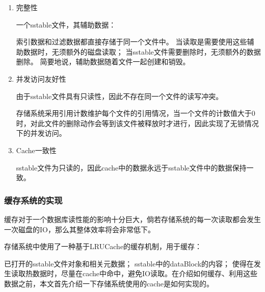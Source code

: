 \begin{enumerate}
\begin{enumerate}
\item 完整性

一个sstable文件，其辅助数据：

索引数据和过滤数据都直接存储于同一个文件中。
当读取是需要使用这些辅助数据时，无须额外的磁盘读取；
当sstable文件需要删除时，无须额外的数据删除。
简要地说，辅助数据随着文件一起创建和销毁。

\item 并发访问友好性

由于sstable文件具有只读性，因此不存在同一个文件的读写冲突。

存储系统采用引用计数维护每个文件的引用情况，当一个文件的计数值大于0时，对此文件的删除动作会等到该文件被释放时才进行，因此实现了无锁情况下的并发访问。

\item Cache一致性

sstable文件为只读的，因此cache中的数据永远于sstable文件中的数据保持一致。
				\end{enumerate}
			\end{enumerate}


		\subsubsection{缓存系统的实现}

		缓存对于一个数据库读性能的影响十分巨大，倘若存储系统的每一次读取都会发生一次磁盘的IO，那么其整体效率将会非常低下。

		存储系统中使用了一种基于LRUCache的缓存机制，用于缓存：
		
		已打开的sstable文件对象和相关元数据；
		sstable中的dataBlock的内容；
		使得在发生读取热数据时，尽量在cache中命中，避免IO读取。在介绍如何缓存、利用这些数据之前，本文首先介绍一下存储系统使用的cache是如何实现的。
		
